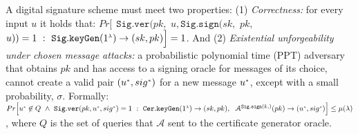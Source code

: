 

A digital signature scheme must meet two properties: (1) \textit{Correctness:} for every input $u$ it holds that:
%
$Pr\Big[\  \  \mathtt{Sig.ver}( pk, $ $u, \mathtt{Sig.sign}(sk,$ $ pk,$ $ u))=1\ : \
\mathtt{Sig.keyGen}(1^{\scriptscriptstyle \lambda})\rightarrow (sk, pk)  \Big]=1$. And 
%
(2) \textit{Existential unforgeability under chosen message attacks:} a probabilistic polynomial time (PPT) adversary that obtains $pk$ and has access to a signing oracle for messages of its choice, cannot create a valid pair $(u^{\scriptscriptstyle *},sig^{\scriptscriptstyle *})$ for a new message $u^{\scriptscriptstyle *}$, except with a small probability, $\sigma$. Formally: 
%
%
{\small{
$ Pr\Big[
 u^{\st *}\not\in Q\ \wedge \
   \mathtt{Sig.ver}( pk,  u^{\st *}, sig^{\st *}) =1\ : \ 
% 
    \mathtt{Cer.keyGen}(1^{\st \lambda})\rightarrow (sk,pk), \ \ 
  \mathcal{A}^{\mathtt{Sig.sign}(k,)}(pk)\rightarrow(u^{\st *}, sig^{\st *}) 
   \Big]\leq \mu(\lambda)$}},
where $Q$ is the set of queries that $\mathcal{A}$ sent to the certificate generator oracle.






